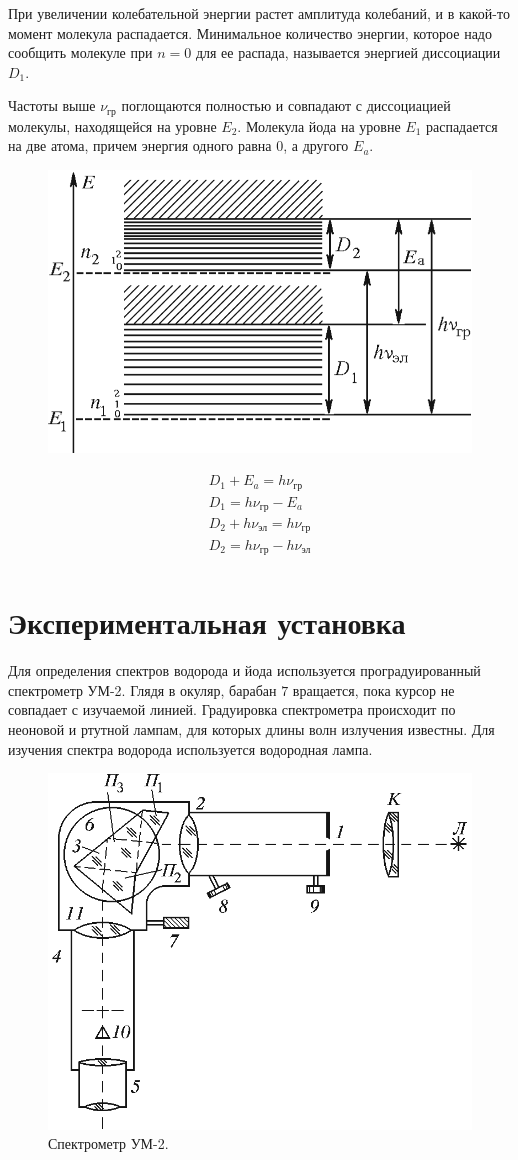 \documentclass[12pt]{article}
\begin{document}
При увеличении колебательной энергии растет амплитуда колебаний, и в какой-то момент молекула распадается.
Минимальное количество энергии, которое надо сообщить молекуле при $n = 0$ для ее распада,
называется энергией диссоциации $D_1$.

Частоты выше $\nu_{\text{гр}}$ поглощаются полностью и совпадают с диссоциацией молекулы, находящейся
на уровне $E_2$. Молекула йода на уровне $E_1$ распадается на две атома,
причем энергия одного равна $0$, а другого $E_a$.

\begin{figure}[H]
    \centering
    \includegraphics[width=0.5\linewidth]{struct1.png}
\end{figure}

\begin{gather*}
    D_1 + E_a = h \nu_{\text{гр}} \\
    D_1 = h \nu_{\text{гр}} - E_a \\
    D_2 + h \nu_{\text{эл}} = h \nu_{\text{гр}} \\
    D_2 = h \nu_{\text{гр}} - h \nu_{\text{эл}} \\
\end{gather*}

\section{Экспериментальная установка}

Для определения спектров водорода и йода используется проградуированный спектрометр УМ-2. Глядя в окуляр,
барабан $7$ вращается, пока курсор не совпадает с изучаемой линией.
Градуировка спектрометра происходит по неоновой и ртутной лампам, для которых длины волн излучения
известны. Для изучения спектра водорода используется водородная лампа.

\begin{figure}[H]
    \caption{Спектрометр УМ-2.}
    \centering
    \includegraphics[width=0.5\linewidth]{um2.png}
\end{figure}
\end{document}
